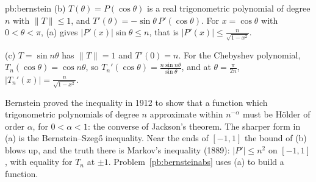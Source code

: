 \begin{solution}{pb:bernstein}
(b) $T(\theta)=P(\cos\theta)$ is a real trigonometric polynomial of degree $n$ with $\|T\|\le1$, and $T'(\theta)=-\sin\theta\,P'(\cos\theta)$. For $x=\cos\theta$ with
$0<\theta<\pi$, (a) gives $|P'(x)|\sin\theta\le n$, that is $|P'(x)|\le\frac n{\sqrt{1-x^2}}$.

(c) $T=\sin n\theta$ has $\|T\|=1$ and $T'(0)=n$. For the Chebyshev polynomial, $T_n(\cos\theta)=\cos n\theta$, so $T_n'(\cos\theta)=\frac{n\sin n\theta}{\sin\theta}$, and at $\theta=\frac\pi{2n}$,
$|T_n'(x)|=\frac n{\sqrt{1-x^2}}$.

\leads Bernstein proved the inequality in 1912 to show that a function which trigonometric polynomials
of degree $n$ approximate within $n^{-\alpha}$ must be Hölder of order $\alpha$, for $0<\alpha<1$: the converse of Jackson's theorem. The sharper form
in (a) is the Bernstein--Szegő inequality. Near the ends of $[-1,1]$ the bound of (b) blows up, and the truth there is Markov's
inequality (1889): $|P'|\le n^2$ on $[-1,1]$, with equality for $T_n$ at $\pm1$. Problem~\ref{pb:bernsteinabs} uses (a) to build a function.
\end{solution}

